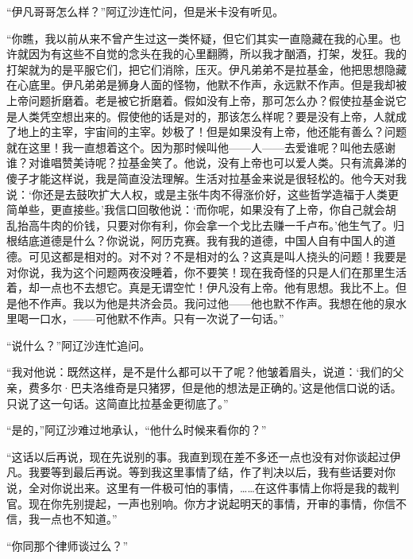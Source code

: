 \par “伊凡哥哥怎么样？”阿辽沙连忙问，但是米卡没有听见。
\par “你瞧，我以前从来不曾产生过这一类怀疑，但它们其实一直隐藏在我的心里。也许就因为有这些不自觉的念头在我的心里翻腾，所以我才酗酒，打架，发狂。我的打架就为的是平服它们，把它们消除，压灭。伊凡弟弟不是拉基金，他把思想隐藏在心底里。伊凡弟弟是狮身人面的怪物，他默不作声，永远默不作声。但是我却被上帝问题折磨着。老是被它折磨着。假如没有上帝，那可怎么办？假使拉基金说它是人类凭空想出来的。假使他的话是对的，那该怎么样呢？要是没有上帝，人就成了地上的主宰，宇宙间的主宰。妙极了！但是如果没有上帝，他还能有善么？问题就在这里！我一直想着这个。因为那时候叫他——人——去爱谁呢？叫他去感谢谁？对谁唱赞美诗呢？拉基金笑了。他说，没有上帝也可以爱人类。只有流鼻涕的傻子才能这样说，我是简直没法理解。生活对拉基金来说是很轻松的。他今天对我说：‘你还是去鼓吹扩大人权，或是主张牛肉不得涨价好，这些哲学造福于人类更简单些，更直接些。’我信口回敬他说：‘而你呢，如果没有了上帝，你自己就会胡乱抬高牛肉的价钱，只要对你有利，你会拿一个戈比去赚一千卢布。’他生气了。归根结底道德是什么？你说说，阿历克赛。我有我的道德，中国人自有中国人的道德。可见这都是相对的。对不对？不是相对的么？这真是叫人挠头的问题！我要是对你说，我为这个问题两夜没睡着，你不要笑！现在我奇怪的只是人们在那里生活着，却一点也不去想它。真是无谓空忙！伊凡没有上帝。他有思想。我比不上。但是他不作声。我以为他是共济会员。我问过他——他也默不作声。我想在他的泉水里喝一口水，——可他默不作声。只有一次说了一句话。”
\par “说什么？”阿辽沙连忙追问。
\par “我对他说：既然这样，是不是什么都可以干了呢？他皱着眉头，说道：‘我们的父亲，费多尔·巴夫洛维奇是只猪猡，但是他的想法是正确的。’这是他信口说的话。只说了这一句话。这简直比拉基金更彻底了。”
\par “是的，”阿辽沙难过地承认，“他什么时候来看你的？”
\par “这话以后再说，现在先说别的事。我直到现在差不多还一点也没有对你谈起过伊凡。我要等到最后再说。等到我这里事情了结，作了判决以后，我有些话要对你说，全对你说出来。这里有一件极可怕的事情，……在这件事情上你将是我的裁判官。现在你先别提起，一声也别响。你方才说起明天的事情，开审的事情，你信不信，我一点也不知道。”
\par “你同那个律师谈过么？”
